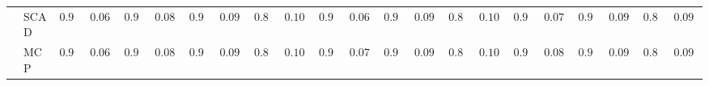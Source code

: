 \begin{tabular}{p{0.2cm}p{1cm}|p{0.6cm}p{0.6cm}|p{0.6cm}p{0.6cm}p{0.6cm}p{0.6cm}p{0.6cm}p{0.6cm}|p{0.6cm}p{0.6cm}p{0.6cm}p{0.6cm}p{0.6cm}p{0.6cm}|p{0.6cm}p{0.6cm}p{0.6cm}p{0.6cm}p{0.6cm}p{0.6cm}}
 & SCAD  & $0.976$ & $0.0653$ & $0.960$ & $0.0804$ & $0.928$ & $0.0965$ & $0.868$ & $0.1072$ & $0.976$ & $0.0653$ & $0.940$ & $0.0921$ & $0.846$ & $0.1058$ & $0.966$ & $0.0755$ & $0.930$ & $0.0959$ & $0.862$ & $0.0972$ \\
 & MCP  & $0.972$ & $0.0697$ & $0.956$ & $0.0833$ & $0.926$ & $0.0970$ & $0.866$ & $0.1066$ & $0.968$ & $0.0737$ & $0.922$ & $0.0980$ & $0.836$ & $0.1040$ & $0.958$ & $0.0819$ & $0.918$ & $0.0989$ & $0.856$ & $0.0988$ \\
\hline 
\end{tabular}

